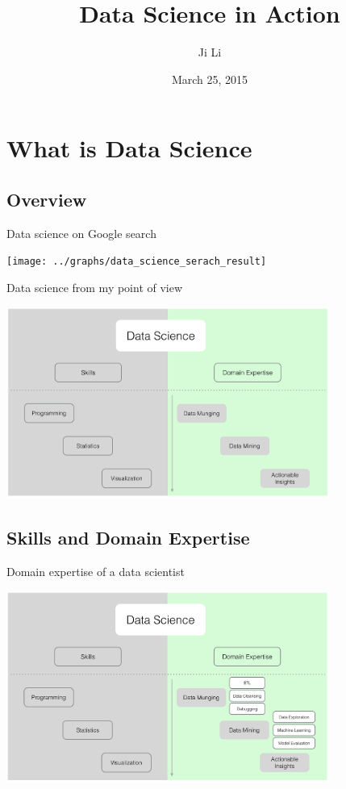 \documentclass[10pt]{beamer}
\title[Data Science]{Data Science in Action}
\author[JL]{Ji Li}
\institute[DS]{Data Scientist}
\date{March 25, 2015}
\begin{document}
\frame{\titlepage}


\section{What is Data Science}

  \subsection{Overview}

    \begin{frame}{Data science on Google search}
      \begin{center}
        \texttt{[image: ../graphs/data\_science\_serach\_result]}
      \end{center}
    \end{frame}

    \begin{frame}{Data science from my point of view}
      \begin{center}
        \includegraphics[width=300pt]{../graphs/data_science_structure}
      \end{center}
    \end{frame}

  \subsection{Skills and Domain Expertise}
  
    \begin{frame}{Domain expertise of a data scientist}
      \begin{center}
        \includegraphics[width=300pt]{../graphs/data_science_domain}
      \end{center}
    \end{frame}
\end{document}
